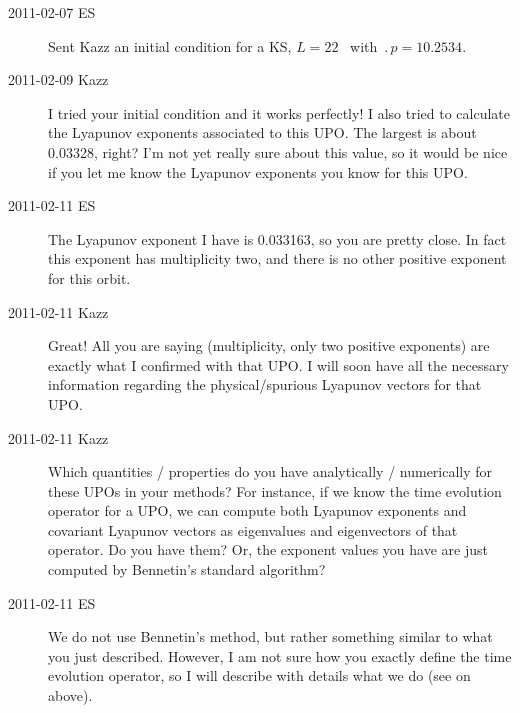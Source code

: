 \begin{description}
\item[2011-02-07 ES] Sent Kazz an initial condition for a KS, $L=22$ \po\
with $\period{p}=10.2534$.

\item[2011-02-09 Kazz] I tried your initial condition and it works perfectly!
I also tried to calculate the Lyapunov exponents associated to this UPO.
The largest is about 0.03328, right? I'm not yet really sure about this value,
so it would be nice if you let me know the Lyapunov exponents you know for this UPO.

\item[2011-02-11 ES] The Lyapunov exponent I have is 0.033163, so you
are pretty close. In fact this exponent has multiplicity two, and
there is no other positive exponent for this orbit.

\item[2011-02-11 Kazz] Great! All you are saying (multiplicity, only two positive
exponents) are exactly what I confirmed with that UPO. I will soon have all
the necessary information regarding the physical/spurious Lyapunov vectors for that UPO.

\item[2011-02-11 Kazz] Which quantities / properties do you have
analytically / numerically for these UPOs in your methods? For instance,
if we know the time evolution operator for a UPO, we can compute both
Lyapunov exponents and covariant Lyapunov vectors as eigenvalues and
eigenvectors of that operator. Do you have them? Or, the exponent values
you have are just computed by Bennetin's standard algorithm?

\renewcommand{\ssp}{x}

\item[2011-02-11 ES] We do not use Bennetin's method, but rather
something similar to what you just described. However, I am not sure how
you exactly define the time evolution operator, so I will describe with
details what we do (see \refrem{rem:Lyapunov} on \refpage{rem:Lyapunov} above).


\end{description}
